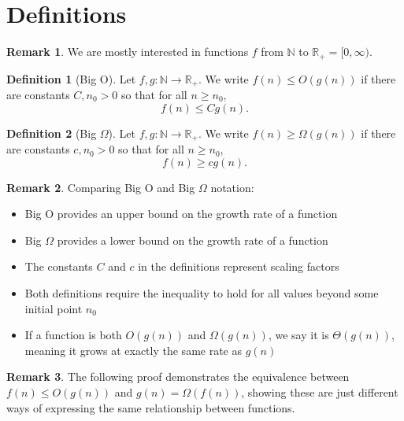 \documentclass{article}
\theoremstyle{definition}
\newtheorem{definition}{Definition}
\newtheorem{remark}{Remark}
\begin{document}
\section{Definitions}

\cite{devvrit2024matformernestedtransformerelastic}

\begin{remark}
We are mostly interested in functions $f$ from $\mathbb{N}$ to $\mathbb{R}_+ = [0,\infty)$.
\end{remark}

\begin{definition}[Big O]
Let $f,g : \mathbb{N} \to \mathbb{R}_+$. We write $f(n) \leq O(g(n))$ if there are constants $C,n_0 > 0$ so that for all $n \geq n_0$,
\[ f(n) \leq Cg(n). \]
\end{definition}

\begin{definition}[Big $\Omega$]
Let $f,g : \mathbb{N} \to \mathbb{R}_+$. We write $f(n) \geq \Omega(g(n))$ if there are constants $c,n_0 > 0$ so that for all $n \geq n_0$,
\[ f(n) \geq cg(n). \]
\end{definition}

\begin{remark}
Comparing Big O and Big $\Omega$ notation:
\begin{itemize}
    \item Big O provides an upper bound on the growth rate of a function
    \item Big $\Omega$ provides a lower bound on the growth rate of a function
    \item The constants $C$ and $c$ in the definitions represent scaling factors
    \item Both definitions require the inequality to hold for all values beyond some initial point $n_0$
    \item If a function is both $O(g(n))$ and $\Omega(g(n))$, we say it is $\Theta(g(n))$, meaning it grows at exactly the same rate as $g(n)$
\end{itemize}
\end{remark}

\begin{remark}
The following proof demonstrates the equivalence between $f(n) \leq O(g(n))$ and $g(n) = \Omega(f(n))$, showing these are just different ways of expressing the same relationship between functions.
\end{remark}
\end{document}
